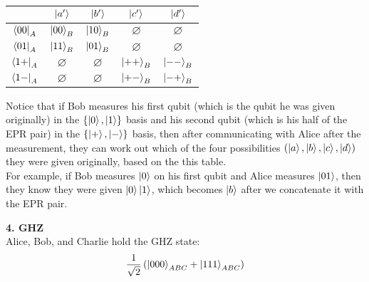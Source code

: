\documentclass{article}
\theoremstyle{definition}
\newcommand{\f}[2]{\frac{#1}{#2}}
\newcommand{\lp}{\left(}
\newcommand{\rp}{\right)}
\begin{document}
\begin{enumerate}[label=(\alph*)]
	\begin{center}
	\begin{tabular}{| c | c | c | c  | c | }
		\hline
		 			& $\ket{a'}$ &  $\ket{b'}$ &  $\ket{c'}$ &  $\ket{d'}$ \\
		 			\hline
		 $\bra{00}_A$	& $\ket{00}_B$  & $\ket{10}_B$  & $\varnothing$& $\varnothing$\\
		 $\bra{01}_A$	& $\ket{11}_B$  & $\ket{01}_B$  & $\varnothing$& $\varnothing$\\
		 $\bra{1+}_A$	& $\varnothing$ & $\varnothing$ & $\ket{++}_B$ & $\ket{--}_B$\\
		 $\bra{1-}_A$	& $\varnothing$ & $\varnothing$ & $\ket{+-}_B$ & $\ket{-+}_B$\\
		 \hline
	\end{tabular}
\end{center}

Notice that if Bob measures his first qubit (which is the qubit he was given originally) in the $\{ \ket{0}, \ket{1}  \}$ basis and his second qubit (which is his half of the EPR pair) in the $\{ \ket{+}, \ket{-} \}$ basis, then after communicating with Alice after the measurement, they can work out which of the four possibilities $(\ket{a}, \ket{b}, \ket{c}, \ket{d})$ they were given originally, based on the this table. \\

For example, if Bob measures $\ket{0}$ on his first qubit and Alice measures $\ket{01}$, then they know they were given $\ket{0}\ket{1}$, which becomes $\ket{b}$ after we concatenate it with the EPR pair. 


	
	
\end{enumerate}


\noindent \textbf{4. GHZ}\\

Alice, Bob, and Charlie hold the GHZ state:
\begin{align*}
	\f{1}{\sqrt{2}} \lp \ket{000}_{ABC} + \ket{111}_{ABC} \rp
\end{align*}
\end{document}
